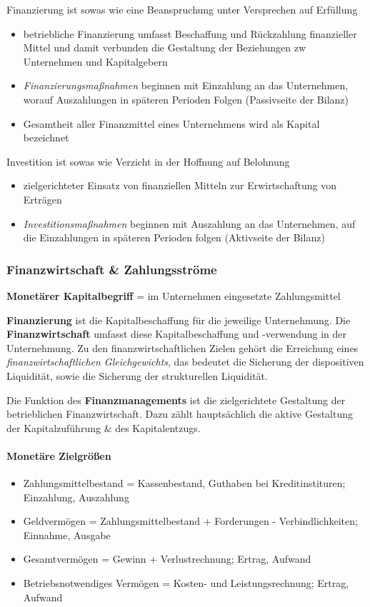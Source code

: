 \documentclass[11pt]{article}
\begin{document}
Finanzierung ist sowas wie eine Beanspruchung unter Versprechen auf Erfüllung
\begin{itemize}
\item betriebliche Finanzierung umfasst Beschaffung und Rückzahlung finanzieller Mittel und damit verbunden die Gestaltung der Beziehungen zw Unternehmen und Kapitalgebern
\item \emph{Finanzierungsmaßnahmen} beginnen mit Einzahlung an das Unternehmen, worauf Auszahlungen in späteren Perioden Folgen (Passivseite der Bilanz)
\item Gesamtheit aller Finanzmittel eines Unternehmens wird als Kapital bezeichnet
\end{itemize}

Investition ist sowas wie Verzicht in der Hoffnung auf Belohnung
\begin{itemize}
\item zielgerichteter Einsatz von finanziellen Mitteln zur Erwirtschaftung von Erträgen
\item \emph{Investitionsmaßnahmen} beginnen mit Auszahlung an das Unternehmen, auf die Einzahlungen in späteren Perioden folgen (Aktivseite der Bilanz)
\end{itemize}

\subsubsection{Finanzwirtschaft \& Zahlungsströme}
\label{sec:org76b690e}
\textbf{Monetärer Kapitalbegriff} = im Unternehmen eingesetzte Zahlungsmittel

\textbf{Finanzierung} ist die Kapitalbeschaffung für die jeweilige Unternehmung. Die \textbf{Finanzwirtschaft} umfasst diese Kapitalbeschaffung und -verwendung in der Unternehmung. Zu den finanzwirtschaftlichen Zielen gehört die Erreichung eines \emph{finanzwirtschaftlichen Gleichgewichts}, das bedeutet die Sicherung der dispositiven Liquidität, sowie die Sicherung der strukturellen Liquidität.

Die Funktion des \textbf{Finanzmanagements} ist die zielgerichtete Gestaltung der betrieblichen Finanzwirtschaft. Dazu zählt hauptsächlich die aktive Gestaltung der Kapitalzuführung \& des Kapitalentzugs.

\paragraph{Monetäre Zielgrößen}
\begin{itemize}
\item Zahlungsmittelbestand = Kassenbestand, Guthaben bei Kreditinstituren; Einzahlung, Auszahlung
\item Geldvermögen = Zahlungsmittelbestand + Forderungen - Verbindlichkeiten; Einnahme, Ausgabe
\item Gesamtvermögen = Gewinn + Verlustrechnung; Ertrag, Aufwand
\item Betriebsnotwendiges Vermögen = Kosten- und Leistungsrechnung; Ertrag, Aufwand
\end{itemize}
\end{document}
